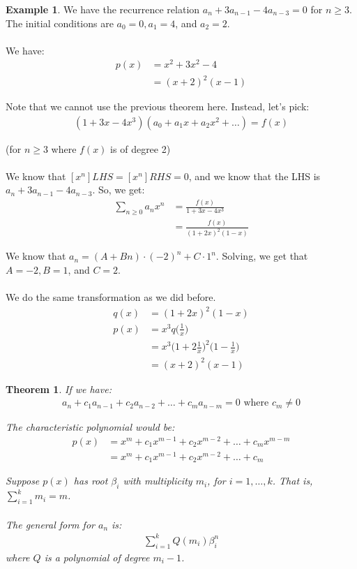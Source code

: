 \documentclass[]{article}
\newtheorem*{theorem}{Theorem}
\theoremstyle{definition}
\newtheorem{ex}{Example}[section]
\newcommand{\lecture}[1]{\marginpar{{\footnotesize $\leftarrow$ \underline{#1}}}}
\begin{document}
		\begin{ex}
			We have the recurrence relation $a_n + 3a_{n - 1} - 4a_{n - 3} = 0$ for $n \ge 3$. The initial conditions are $a_0 = 0, a_1 = 4$, and $a_2 = 2$.
			\\ \\
			We have:
			\begin{align*}
				p(x) &= x^2 + 3x^2 - 4 \\
				&= (x + 2)^2 (x - 1)
			\end{align*}

			Note that we cannot use the previous theorem here. Instead, let's pick:
			\begin{align*}
				(1 + 3x - 4x^3)(a_0 + a_1x + a_2x^2 + \ldots) = f(x)
			\end{align*}

			(for $n \ge 3$ where $f(x)$ is of degree 2)
			\\ \\
			We know that $[x^n]LHS = [x^n]RHS = 0$, and we know that the LHS is $a_n + 3a_{n - 1} - 4a_{n - 3}$. So, we get:
			\begin{align*}
				\sum_{n \ge 0} a_n x^n &= \frac{f(x)}{1 + 3x - 4x^3} \\
				&= \frac{f(x)}{(1 + 2x)^2 (1 - x)}
			\end{align*}

			We know that $a_n = (A + Bn) \cdot (-2)^n + C \cdot 1^n$. Solving, we get that $A = -2, B = 1$, and $C = 2$. \lecture{February 13, 2013}
			\\ \\
			We do the same transformation as we did before.
			\begin{align*}
				q(x) &= (1 + 2x)^2 (1 - x) \\
				p(x) &= x^3 q\bigg(\frac{1}{x}\bigg) \\
				&= x^3\bigg( 1 + 2\frac{1}{x} \bigg)^2 \bigg(1 - \frac{1}{x} \bigg) \\
				&= (x + 2)^2 (x - 1)
			\end{align*}
		\end{ex}

		\begin{theorem}
			If we have:
			\begin{align*}
				a_n + c_1a_{n - 1} +c_2a_{n - 2} + \ldots + c_ma_{n - m} = 0 \text{ where } c_m \ne 0
			\end{align*}

			The characteristic polynomial would be:
			\begin{align*}
				p(x) &= x^m + c_1x^{m - 1} + c_2x^{m - 2} + \ldots + c_mx^{m - m} \\
				&= x^m + c_1x^{m - 1} + c_2x^{m - 2} + \ldots + c_m
			\end{align*}

			Suppose $p(x)$ has root $\beta_i$ with multiplicity $m_i$, for $i = 1, \ldots, k$. That is, $\sum_{i = 1}^{k} m_i = m$.
			\\ \\
			The general form for $a_n$ is:
			\begin{align*}
				\sum_{i = 1}^{k} Q(m_i) \beta_i^n
			\end{align*}
			where $Q$ is a polynomial of degree $m_i - 1$.
		\end{theorem}
\end{document}
